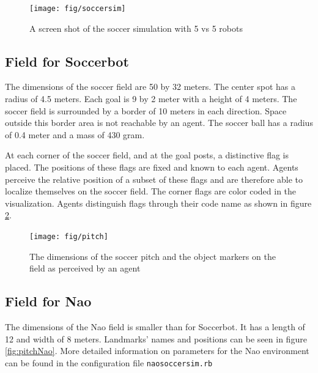 \begin{figure}[htp]
  \centering
  \texttt{[image: fig/soccersim]}
  \caption{A screen shot of the soccer simulation with 5 vs 5 robots}
  \label{fig:soccersim}
\end{figure}

\subsection{Field for Soccerbot}

The dimensions of the soccer field are 50 by 32 meters. The center
spot has a radius of 4.5 meters. Each goal is 9 by 2 meter with a
height of 4 meters. The soccer field is surrounded by a border of 10
meters in each direction. Space outside this border area is not
reachable by an agent. The soccer ball has a radius of 0.4 meter and a
mass of 430 gram.

At each corner of the soccer field, and at the goal posts, a distinctive
flag is placed. The positions of these flags are fixed and known to
each agent. Agents perceive the relative position of a subset of
these flags and are therefore able to localize themselves on the soccer
field. The corner flags are color coded in the visualization. Agents
distinguish flags through their code name as shown in figure
\ref{fig:pitch}.

\begin{figure}[htp]
  \centering
  \texttt{[image: fig/pitch]}
  \caption{The dimensions of the soccer pitch and the object markers on the field as perceived by an agent}
  \label{fig:pitch}
\end{figure}

\subsection{Field for Nao}

The dimensions of the Nao field is smaller than for Soccerbot. It has a length
of 12 and width of 8 meters. Landmarks' names and positions can be seen in
figure \ref{fig:pitchNao}. More detailed information on parameters for the Nao
environment can be found in the configuration file \texttt{naosoccersim.rb}


